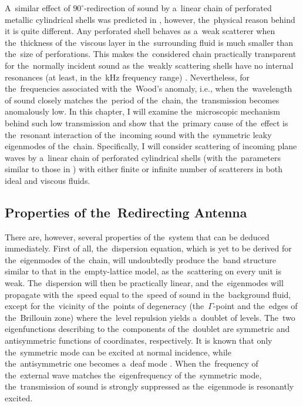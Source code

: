 A~similar effect of $90^{\circ}$-redirection of sound by a~linear chain of perforated metallic cylindrical shells was predicted in \cite{garcia1}, however, the~physical reason behind it is quite different.
Any perforated shell behaves as a~weak scatterer when the~thickness of the~viscous layer in the~surrounding fluid is much smaller than the~size of perforations. %
This makes the~considered chain practically transparent for the~normally incident sound as the~weakly scattering shells have no internal resonances (at least, in the~kHz frequency range) \cite{garcia1}.
Nevertheless, for the~frequencies associated with the~Wood's anomaly, i.e., when the~wavelength of sound closely matches the~period of the~chain, the~transmission becomes anomalously low.
In this chapter, I will examine the~microscopic mechanism behind such low transmission and show that the~primary cause of the~effect is the~resonant interaction of the~incoming sound with the~symmetric leaky eigenmodes of the~chain.
Specifically, I will consider scattering of incoming plane waves by a~linear chain of perforated cylindrical shells (with the~parameters similar to those in \cite{garcia1}) with either finite or infinite number of scatterers in both ideal and viscous fluids.

\subsection{Properties of the~Redirecting Antenna}

There are, however, several properties of the~system that can be deduced immediately.
First of all, the~dispersion equation, which is yet to be derived for the~eigenmodes of the~chain, will undoubtedly produce the~band structure similar to that in the~empty-lattice model, as the~scattering on every unit is weak.
The~dispersion will then be practically linear, and the~eigenmodes will propagate with the~speed equal to the~speed of sound in the~background fluid, except for the~vicinity of the~points of degeneracy (the~$\Gamma$-point and the~edges of the~Brillouin zone) where the~level repulsion yields a~doublet of levels.
The~two eigenfunctions describing to the~components of the~doublet are symmetric and antisymmetric functions of coordinates, respectively.
It is known that only the~symmetric mode can be excited at normal incidence, while the~antisymmetric one becomes a~deaf mode \cite{jose,ward}.
When the~frequency of the~external wave matches the~eigenfrequency of the~symmetric mode, the~transmission of sound is strongly suppressed as the~eigenmode is resonantly excited.

